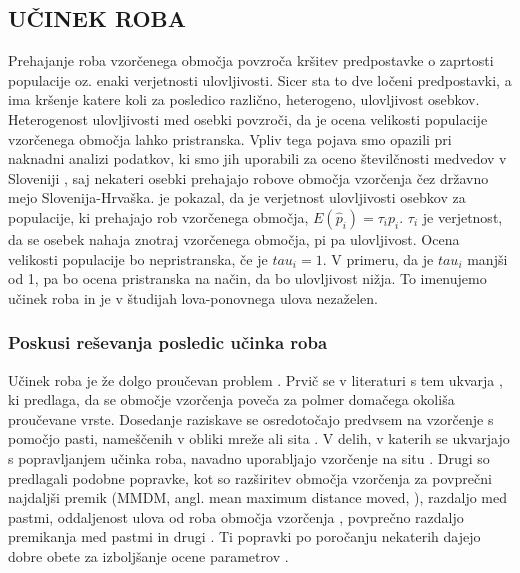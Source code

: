 \subsection{UČINEK ROBA}
Prehajanje roba vzorčenega območja povzroča kršitev predpostavke o zaprtosti populacije oz. enaki verjetnosti ulovljivosti. Sicer sta to dve ločeni predpostavki, a ima kršenje katere koli za posledico različno, heterogeno, ulovljivost osebkov. Heterogenost ulovljivosti med osebki povzroči, da je ocena velikosti populacije vzorčenega območja lahko pristranska. Vpliv tega pojava smo opazili pri naknadni analizi podatkov, ki smo jih uporabili za oceno številčnosti medvedov v Sloveniji \citep{skrbinsek_lustrik_2018}, saj nekateri osebki prehajajo robove območja vzorčenja čez državno mejo Slovenija-Hrvaška. \citet{kendall_robustness_1999} je pokazal, da je verjetnost ulovljivosti osebkov za populacije, ki prehajajo rob vzorčenega območja, $E(\hat{p}_i) = \tau_i p_i$. $\tau_i$ je verjetnost, da se osebek nahaja znotraj vzorčenega območja, pi pa ulovljivost. Ocena velikosti populacije bo nepristranska, če je $tau_i = 1$. V primeru, da je $tau_i$ manjši od 1, pa bo ocena pristranska na način, da bo ulovljivost nižja. To imenujemo učinek roba \citep{hansson_home_1969, white_capture-recapture_1982, wilson_evaluation_1985} in je v študijah lova-ponovnega ulova nezaželen.

\subsubsection[\bfseries{Poskusi reševanja posledic učinka roba}]{Poskusi reševanja posledic učinka roba}
Učinek roba je že dolgo proučevan problem \citep{efford_density_2004}. Prvič se v literaturi s tem ukvarja \citet{dice_census_1938, dice_methods_1941}, ki predlaga, da se območje vzorčenja poveča za polmer domačega okoliša proučevane vrste. Dosedanje raziskave se osredotočajo predvsem na vzorčenje s pomočjo pasti, nameščenih v obliki mreže ali sita \citep{williams_analysis_2002}. V delih, v katerih se ukvarjajo s popravljanjem učinka roba, navadno uporabljajo vzorčenje na situ \citep{parmenter_small-mammal_2003}. Drugi so predlagali podobne popravke, kot so razširitev območja vzorčenja za povprečni najdaljši premik (MMDM, angl. mean maximum distance moved, \citet{wilson_evaluation_1985}), razdaljo med pastmi, oddaljenost ulova od roba območja vzorčenja \citep{boulanger_sources_2004}, povprečno razdaljo premikanja med pastmi in drugi \citep{miller_brown_1997, boulanger_corrigendum_2001, royle_spatial_2013}. Ti popravki po poročanju nekaterih dajejo dobre obete za izboljšanje ocene parametrov \citep{whittington_comparison_2015}.

